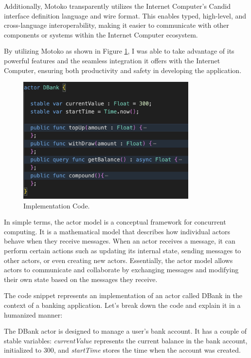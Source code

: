 Additionally, Motoko transparently utilizes the Internet Computer's Candid interface definition language and wire format. This enables typed, high-level, and cross-language interoperability, making it easier to communicate with other components or systems within the Internet Computer ecosystem.

By utilizing Motoko as shown in Figure \ref{fig:Implementation Code}, I was able to take advantage of its powerful features and the seamless integration it offers with the Internet Computer, ensuring both productivity and safety in developing the application.

\begin{figure}[H]
    \centering
    \includegraphics[width=0.8\textwidth]{Implementation.png}
    \caption{Implementation Code.}
    \label{fig:Implementation Code}
\end{figure}

In simple terms, the actor model is a conceptual framework for concurrent computing. It is a mathematical model that describes how individual actors behave when they receive messages. When an actor receives a message, it can perform certain actions such as updating its internal state, sending messages to other actors, or even creating new actors. Essentially, the actor model allows actors to communicate and collaborate by exchanging messages and modifying their own state based on the messages they receive.


The code snippet represents an implementation of an actor called DBank in the context of a banking application. Let's break down the code and explain it in a humanized manner:

The DBank actor is designed to manage a user's bank account. It has a couple of stable variables: \textit{currentValue} represents the current balance in the bank account, initialized to 300, and \textit{startTime} stores the time when the account was created.

